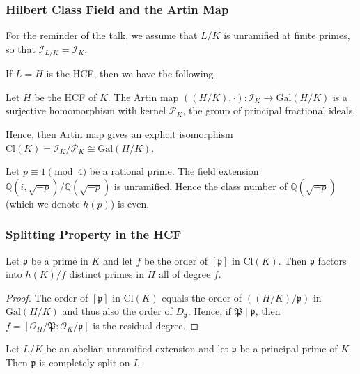 \documentclass{beamer}
\newcommand{\Gal}{\mathrm{Gal}}
\newcommand{\Cl}{\mathrm{Cl}}
\newcommand{\PP}{\mathfrak{P}}
\newcommand{\QQ}{\mathbb{Q}}
\newcommand{\pp}{\mathfrak{p}}
\theoremstyle{plain}
\begin{document}
\begin{frame}
    \frametitle{Hilbert Class Field and the Artin Map}
    For the reminder of the talk, we assume that $L/K$ is unramified at finite primes, so that $\mathcal{I}_{L/K}=\mathcal{I}_K$. 
    
    If $L=H$ is the HCF, then we have the following
    \begin{theorem}
        Let $H$ be the HCF of $K$. The Artin map $((H/K),\cdot):\mathcal{I}_K\to\Gal(H/K)$ is a surjective homomorphism with kernel $\mathcal{P}_K$, the group of principal fractional ideals.
        
        Hence, then Artin map gives an explicit isomorphism $\Cl(K)=\mathcal{I}_K/\mathcal{P}_K\cong\Gal(H/K)$.
    \end{theorem}

    \begin{example}
        Let $p\equiv1\pmod{4}$ be a rational prime. The field extension $\QQ(i,\sqrt{-p})/\QQ(\sqrt{-p})$ is unramified. Hence the class number of $\QQ(\sqrt{-p})$ (which we denote $h(p)$) is even.    
    \end{example}
\end{frame}




\begin{frame}
    \frametitle{Splitting Property in the HCF}
    \begin{corollary}
        Let $\pp$ be a prime in $K$ and let $f$ be the order of $[\pp]$ in $\Cl(K)$. Then $\pp$ factors into $h(K)/f$ distinct primes in $H$ all of degree $f$.         
    \end{corollary}
    \begin{proof}
        The order of $[\pp]$ in $\Cl(K)$ equals the order of $((H/K)/\pp)$ in $\Gal(H/K)$ and thus also the order of $D_\pp$. Hence, if $\PP\mid\pp$, then $f=[\mathcal{O}_H/\PP:\mathcal{O}_K/\pp]$ is the residual degree.
    \end{proof}

    \begin{corollary}
        Let $L/K$ be an abelian unramified extension and let $\pp$ be a principal prime of $K$. Then $\pp$ is completely split on $L$.
    \end{corollary}
    
\end{frame}
\end{document}

